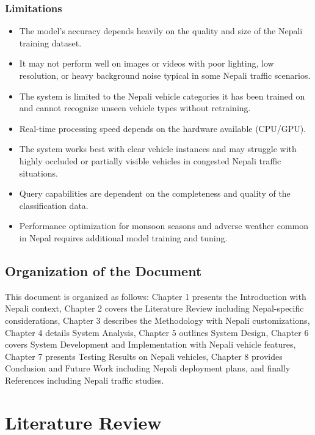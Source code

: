 \documentclass[12pt,a4paper]{report}
\begin{document}
\subsection*{Limitations}
\begin{limitations}
\begin{itemize}
    \item The model's accuracy depends heavily on the quality and size of the Nepali training dataset.
    \item It may not perform well on images or videos with poor lighting, low resolution, or heavy background noise typical in some Nepali traffic scenarios.
    \item The system is limited to the Nepali vehicle categories it has been trained on and cannot recognize unseen vehicle types without retraining.
    \item Real-time processing speed depends on the hardware available (CPU/GPU).
    \item The system works best with clear vehicle instances and may struggle with highly occluded or partially visible vehicles in congested Nepali traffic situations.
    \item Query capabilities are dependent on the completeness and quality of the classification data.
    \item Performance optimization for monsoon seasons and adverse weather common in Nepal requires additional model training and tuning.
    \end{itemize}
\end{limitations}

\section{Organization of the Document}
This document is organized as follows: Chapter 1 presents the Introduction with Nepali context, Chapter 2 covers the Literature Review including Nepal-specific considerations, Chapter 3 describes the Methodology with Nepali customizations, Chapter 4 details System Analysis, Chapter 5 outlines System Design, Chapter 6 covers System Development and Implementation with Nepali vehicle features, Chapter 7 presents Testing Results on Nepali vehicles, Chapter 8 provides Conclusion and Future Work including Nepali deployment plans, and finally References including Nepali traffic studies.

\chapter{Literature Review}
\end{document}

